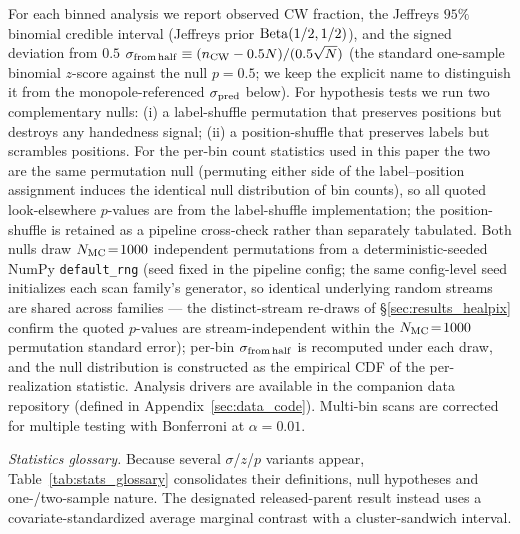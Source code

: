 \documentclass[aps,prd,twocolumn,superscriptaddress,showpacs,preprintnumbers,nofootinbib,longbibliography,floatfix]{revtex4-2}
\begin{document}
For each binned analysis we report observed CW fraction, the Jeffreys
$95\%$ binomial credible interval (Jeffreys prior
${\rm Beta}(1/2,1/2)$), and the signed deviation from $0.5$
$\sigma_{\rm from\,half} \equiv (n_{\rm CW} - 0.5 N)/(0.5\sqrt{N})$
(the standard one-sample binomial $z$-score against the null
$p = 0.5$; we keep the explicit name to distinguish it from the
monopole-referenced $\sigma_{\rm pred}$ below).
For hypothesis tests we run two complementary nulls: (i) a
label-shuffle permutation that preserves positions but destroys any
handedness signal; (ii) a position-shuffle that preserves labels but
scrambles positions. For the per-bin count statistics used in this
paper the two are the same permutation null (permuting either side of
the label--position assignment induces the identical null
distribution of bin counts), so all quoted look-elsewhere $p$-values
are from the label-shuffle implementation; the position-shuffle is
retained as a pipeline cross-check rather than separately tabulated. Both nulls draw $N_{\rm MC}\!=\!1000$
independent permutations from a deterministic-seeded NumPy
\texttt{default\_rng} (seed fixed in the pipeline config; the same
config-level seed initializes each scan family's generator, so
identical underlying random streams are shared across families ---
the distinct-stream re-draws of \S\ref{sec:results_healpix} confirm
the quoted $p$-values are stream-independent within the
$N_{\rm MC}\!=\!1000$ permutation standard error); per-bin
$\sigma_{\rm from\,half}$ is recomputed under each draw, and the
null distribution is constructed as the empirical CDF of the
per-realization statistic. Analysis drivers are available in the
companion data repository (defined in
Appendix~\ref{sec:data_code}). Multi-bin scans are
corrected for multiple testing with Bonferroni at $\alpha\!=\!0.01$.

\emph{Statistics glossary.} Because several $\sigma$/$z$/$p$ variants
appear, Table~\ref{tab:stats_glossary} consolidates their definitions,
null hypotheses and one-/two-sample nature. The designated
released-parent result instead uses a covariate-standardized average
marginal contrast with a cluster-sandwich interval.
\end{document}
